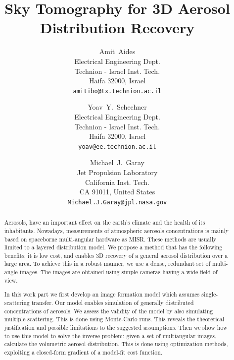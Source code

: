 \documentclass[10pt,twocolumn,letterpaper]{article}
\begin{document}
\title{Sky Tomography for 3D Aerosol Distribution Recovery}

\author{Amit~Aides\\
Electrical Engineering Dept.\\
Technion - Israel Inst. Tech.\\
Haifa 32000, Israel\\
{\tt\small amitibo@tx.technion.ac.il}
\and
Yoav~Y.~Schechner\\
Electrical Engineering Dept.\\
Technion - Israel Inst. Tech.\\
Haifa 32000, Israel\\
{\tt\small yoav@ee.technion.ac.il}
\and
Michael~J.~Garay\\
Jet Propulsion Laboratory\\
California Inst. Tech.\\
CA 91011, United States\\
{\tt\small Michael.J.Garay@jpl.nasa.gov}
}

\maketitle
\thispagestyle{empty}

\begin{abstract}
  Aerosols, have an important effect on the earth's climate and the
  health of its inhabitants. Nowadays, measurements of atmospheric
  aerosols concentrations is mainly based on spaceborne multi-angular
  hardware as MISR. These methods are usually limited to a layered
  distribution model. We propose a method that has the following
  benefits: it is low cost, and enables 3D recovery of a general
  aerosol distribution over a large area.  To achieve this in a robust
  manner, we use a dense, redundant set of multi-angle images. The
  images are obtained using simple cameras having a wide field of
  view.

  In this work part we first develop an image formation model which
  assumes single-scattering transfer.  Our model enables simulation of
  generally distributed concentrations of aerosols.  We assess the
  validity of the model by also simulating multiple scattering. This
  is done using Monte-Carlo runs.  This reveals the theoretical
  justification and possible limitations to the suggested assumptions.
  Then we show how to use this model to solve the inverse problem:
  given a set of multiangular images, calculate the volumetric aerosol
  distribution.  This is done using optimization methods, exploiting a
  closed-form gradient of a model-fit cost function.
\end{abstract}
\end{document}

